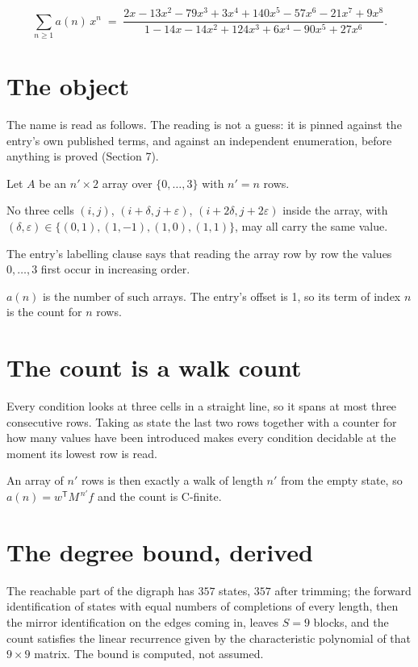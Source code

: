 \documentclass[11pt]{article}
\theoremstyle{definition}
\begin{document}
\[\sum_{n \ge 1} a(n)\,x^n \;=\; \frac{2x - 13x^{2} - 79x^{3} + 3x^{4} + 140x^{5} - 57x^{6} - 21x^{7} + 9x^{8}}{1 - 14x - 14x^{2} + 124x^{3} + 6x^{4} - 90x^{5} + 27x^{6}}.\]

\section{The object}

The name is read as follows. The reading is not a guess: it is pinned against the entry's own published terms, and against an independent enumeration, before anything is proved (Section 7).

Let $A$ be an $n' \times 2$ array over $\{0,\dots,3\}$ with $n' = n$ rows.

No three cells $(i,j)$, $(i{+}\delta,j{+}\varepsilon)$, $(i{+}2\delta,j{+}2\varepsilon)$ inside the array, with $(\delta,\varepsilon) \in \{(0,1), (1,-1), (1,0), (1,1)\}$, may all carry the same value.

The entry's labelling clause says that reading the array row by row the values $0,\dots,3$ first occur in increasing order.

$a(n)$ is the number of such arrays. The entry's offset is 1, so its term of index $n$ is the count for $n$ rows.

\section{The count is a walk count}

Every condition looks at three cells in a straight line, so it spans at most three consecutive rows. Taking as state the last two rows together with a counter for how many values have been introduced makes every condition decidable at the moment its lowest row is read.

An array of $n'$ rows is then exactly a walk of length $n'$ from the empty state, so $a(n) = w^{\mathsf T}M^{\,n'}f$ and the count is C-finite.

\section{The degree bound, derived}

The reachable part of the digraph has $357$ states, $357$ after trimming; the forward identification of states with equal numbers of completions of every length, then the mirror identification on the edges coming in, leaves $S = 9$ blocks, and the count satisfies the linear recurrence given by the characteristic polynomial of that $9\times9$ matrix. The bound is computed, not assumed.
\end{document}
